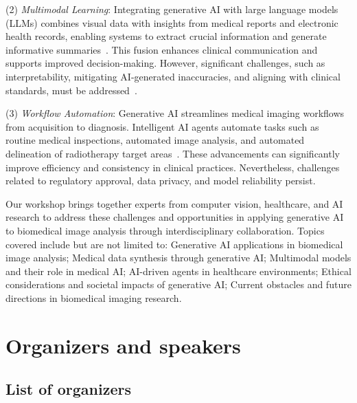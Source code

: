 \documentclass{article}
\begin{document}
(2) \textit{Multimodal Learning}: %
Integrating generative AI with large language models (LLMs) combines visual data with insights from medical reports and electronic health records, enabling systems to extract crucial information and generate informative summaries~\citep{lu2024visual,xiang2025vision,lu2024multimodal}.
%
This fusion enhances clinical communication and supports improved decision-making.
%
However, significant challenges, such as interpretability, mitigating AI-generated inaccuracies, and aligning with clinical standards, must be addressed~\citep{kim2025medical}.

(3) \textit{Workflow Automation}:
%
Generative AI streamlines medical imaging workflows from acquisition to diagnosis. Intelligent AI agents automate tasks such as routine medical inspections, automated image analysis, and automated delineation of radiotherapy target areas~\citep{gao2024empowering,xu2024transforming}.
%
These advancements can significantly improve efficiency and consistency in clinical practices. Nevertheless, challenges related to regulatory approval, data privacy, and model reliability persist.

Our workshop brings together experts from computer vision, healthcare, and AI research to address these challenges and opportunities in applying generative AI to biomedical image analysis through interdisciplinary collaboration.
%
Topics covered include but are not limited to: Generative AI applications in biomedical image analysis; Medical data synthesis through generative AI; Multimodal models and their role in medical AI; AI-driven agents in healthcare environments; Ethical considerations and societal impacts of generative AI; Current obstacles and future directions in biomedical imaging research.





\section{Organizers and speakers}


\subsection{List of organizers}
\end{document}
